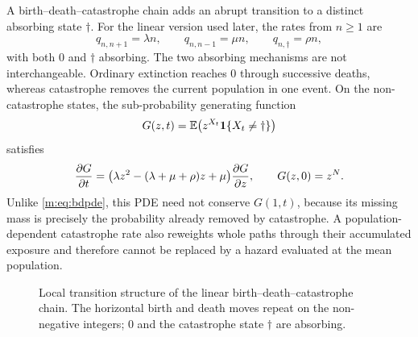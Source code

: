 A birth--death--catastrophe chain adds an abrupt transition to a distinct absorbing
state $\dagger$.  For the linear version used later, the rates from $n\geq1$ are
\begin{equation}
  q_{n,n+1}=\lambda n,\qquad
  q_{n,n-1}=\mu n,\qquad
  q_{n,\dagger}=\rho n,
    \label{m:eq:bdcrates}
\end{equation}
with both $0$ and $\dagger$ absorbing.  The two absorbing mechanisms are not
interchangeable.  Ordinary extinction reaches $0$ through successive deaths,
whereas catastrophe removes the current population in one event.  On the
non-catastrophe states, the sub-probability generating function
\[
  G(z,t)=\mathbb{E}\!\left(z^{X_t}\mathbf 1\{X_t\neq\dagger\}\right)
\]
satisfies
\begin{equation}
  \frac{\partial G}{\partial t}=
  \bigl(\lambda z^2-(\lambda+\mu+\rho)z+\mu\bigr)\frac{\partial G}{\partial z},
  \qquad G(z,0)=z^N.
  \label{m:eq:bdcpde}
\end{equation}
Unlike \cref{m:eq:bdpde}, this PDE need not conserve $G(1,t)$, because its missing
mass is precisely the probability already removed by catastrophe.  A
population-dependent catastrophe rate also reweights whole paths through their
accumulated exposure and therefore cannot be replaced by a hazard evaluated at the
mean population.

\begin{figure}[tbp]
  \centering
  \caption{Local transition structure of the linear
  birth--death--catastrophe chain.  The horizontal birth and death moves repeat
  on the non-negative integers; $0$ and the catastrophe state $\dagger$ are
  absorbing.}
  \label{m:fig:bdc-transitions}
\end{figure}

